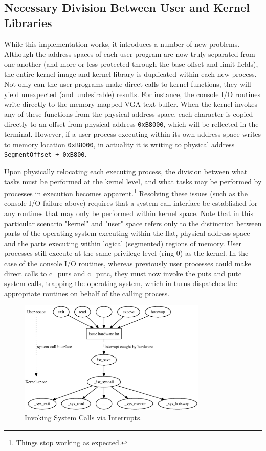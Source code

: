 \documentclass[titlepage]{article}
\begin{document}
\subsection{Necessary Division Between User and Kernel Libraries}

While this implementation works, it introduces a number of new problems.
Although the address spaces of each user program are now truly separated from
one another (and more or less protected through the base offset and limit
fields), the entire kernel image and kernel library is duplicated within each
new process. Not only can the user programs make direct calls to kernel
functions, they will yield unexpected (and undesirable) results. For instance,
the console I/O routines write directly to the memory mapped VGA text buffer.
When the kernel invokes any of these functions from the physical address space,
each character is copied directly to an offset from physical address
\verb!0xB8000!, which will be reflected in the terminal. However, if a user
process executing within its own address space writes to memory location
\verb!0xB8000!, in actuality it is writing to physical address
\verb!SegmentOffset + 0xB800!.

Upon physically relocating each executing process, the division between what
tasks must be performed at the kernel level, and what tasks may be performed
by processes in execution becomes apparent.\footnote{Things stop working as
expected.} Resolving these issues (such as the console I/O failure above)
requires that a system call interface be established for any routines that may
only be performed within kernel space. Note that in this particular scenario
"kernel" and "user" space refers only to the distinction between parts of the
operating system executing within the flat, physical address space and the
parts executing within logical (segmented) regions of memory. User processes
still execute at the same privilege level (ring 0) as the kernel. In the case
of the console I/O routines, whereas previously user processes could make direct
calls to c\_puts and c\_putc, they must now invoke the puts and putc system
calls, trapping the operating system, which in turns dispatches the appropriate
routines on behalf of the calling process.

\begin{figure}[!ht]
    \centering
    \includegraphics[width=0.8\textwidth]{images/interrupts.eps}
    \caption{Invoking System Calls via Interrupts.}
\end{figure}
\end{document}
